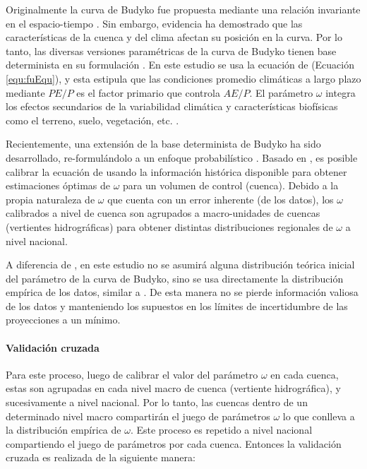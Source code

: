 \documentclass[12pt]{article}
\begin{document}
Originalmente la curva de Budyko fue propuesta mediante una relación invariante en el espacio-tiempo \citep{Budyko1961,Pike1964}. Sin embargo, evidencia ha demostrado que las características de la cuenca y del clima afectan su posición en la curva. Por lo tanto, las diversas versiones paramétricas de la curva de Budyko tienen base determinista en su formulación \citep{Fu1981,Zhang2004,Zhang2008,Wang2014}. En este estudio se usa la ecuación de \citep{Fu1981} (Ecuación \ref{equ:fuEqu}), y esta estipula que las condiciones promedio climáticas a largo plazo mediante $PE/P$ es el factor primario que controla $AE/P$. El parámetro $\omega$ integra los efectos secundarios de la variabilidad climática y características biofísicas como el terreno, suelo, vegetación, etc. \citep{Gentine2012,Berghuijs2014}.

Recientemente, una extensión de la base determinista de Budyko ha sido desarrollado, re-formulándolo a un enfoque probabilístico \citep{Greve2015}. Basado en \citet{Greve2015}, es posible calibrar la ecuación de \cite{Fu1981} usando la información histórica disponible para obtener estimaciones óptimas de $\omega$ para un volumen de control (cuenca). Debido a la propia naturaleza de $\omega$ que cuenta con un error inherente (de los datos), los $\omega$ calibrados a nivel de cuenca son agrupados a macro-unidades de cuencas (vertientes hidrográficas) para obtener distintas distribuciones regionales de $\omega$ a nivel nacional.

A diferencia de \citet{Greve2015}, en este estudio no se asumirá alguna distribución teórica inicial del parámetro de la curva de Budyko, sino se usa directamente la distribución empírica de los datos, similar a \citet{Singh2015}. De esta manera no se pierde información valiosa de los datos y manteniendo los supuestos en los límites de incertidumbre de las proyecciones a un mínimo.

\paragraph{Validación cruzada}\mbox{}

Para este proceso, luego de calibrar el valor del parámetro $\omega$ en cada cuenca, estas son agrupadas en cada nivel macro de cuenca (vertiente hidrográfica), y sucesivamente a nivel nacional. Por lo tanto, las cuencas dentro de un determinado nivel macro compartirán el juego de parámetros $\omega$ lo que conlleva a la distribución empírica de $\omega$. Este proceso es repetido a nivel nacional compartiendo el juego de parámetros por cada cuenca. Entonces la validación cruzada es realizada de la siguiente manera:
\end{document}
